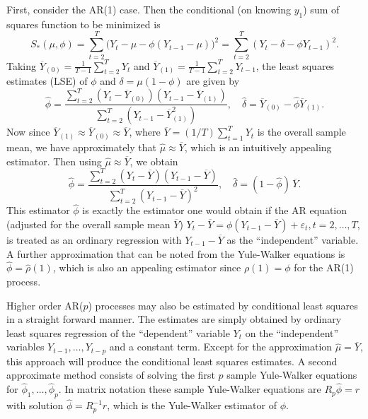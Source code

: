 First, consider the AR(1) case. Then the conditional (on knowing $y_1$) sum of squares function to be minimized is
	\[
	S_*(\mu,\phi) = \sum_{t=2}^T \big(Y_t - \mu - \phi(Y_{t-1} - \mu) \big)^2 = \sum_{t=2}^T (Y_t - \delta - \phi Y_{t-1})^2.
	\]
Taking $\overline{Y}_{(0)} = \frac{1}{T-1} \sum_{t=2}^T Y_t$ and $\overline{Y}_{(1)} = \frac{1}{T-1} \sum_{t=2}^T Y_{t-1}$, the least squares estimates (LSE) of $\phi$ and $\delta = \mu(1 - \phi)$ are given by
	\[
	\hat{\phi} = \dfrac{\sum_{t=2}^T ( Y_t - \overline{Y}_{(0)} ) (Y_{t-1} - \overline{Y}_{(1)} )}{\sum_{t=2}^T ( Y_{t-1} - \overline{Y}_{(1)}^2 )} ,  \quad \hat{\delta} = \overline{Y}_{(0)} - \hat{\phi}\overline{Y}_{(1)}.
	\]
Now since $\overline{Y}_{(1)} \approx \overline{Y}_{(0)} \approx \overline{Y}$, where $\overline{Y} = (1/T) \sum_{t=1}^T Y_t$ is the overall sample mean, we have approximately that $\hat{\mu} \approx \overline{Y}$, which is an intuitively appealing estimator. Then using $\hat{\mu} \approx \overline{Y}$, we obtain
	\begin{equation} \label{eqn:anotherhatphi}
	\hat{\phi} = \frac{\sum_{t=2}^T(Y_t - \overline{Y}) (Y_{t-1} - \overline{Y} )}{\sum_{t=2}^T (Y_{t-1} - \overline{Y})^2}, \quad \hat{\delta}= (1-\hat{\phi}) \, \overline{Y}.
	\end{equation}
This estimator $\hat{\phi}$ is exactly the estimator one would obtain if the AR equation (adjusted for the overall sample mean $\overline{Y}$) $Y_t - \overline{Y} = \phi(Y_{t-1} - \overline{Y}) + \varepsilon_t, t = 2, \ldots, T$, is treated as an ordinary regression with $Y_{t-1} - \overline{Y}$ as the ``independent'' variable. A further approximation that can be noted from the Yule-Walker equations is $\hat{\phi}= \hat{\rho}(1)$, which is also an appealing estimator since $\rho(1) = \phi$ for the AR(1) process. 


Higher order AR($p$) processes may also be estimated by conditional least squares in a straight forward manner. The estimates are simply obtained by ordinary least squares regression of the ``dependent'' variable $Y_t$ on the ``independent'' variables $Y_{t-1}, \ldots, Y_{t-p}$ and a constant term. Except for the approximation $\hat{\mu} = \overline{Y}$, this approach will produce the conditional least squares estimates. A second approximate method consists of solving the first $p$ sample Yule-Walker equations for $\hat{\phi}_1, \ldots, \hat{\phi}_p$. In matrix notation these sample Yule-Walker equations are $R_p\hat{\phi} = r$ with solution $\hat{\phi} = R_p^{-1} r$, which is the Yule-Walker estimator of $\phi$.


